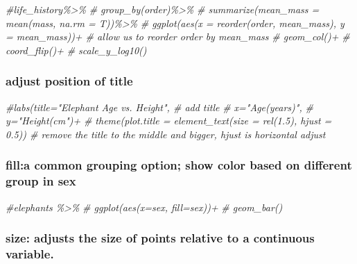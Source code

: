\documentclass[
]{article}
\newenvironment{Shaded}{\begin{snugshade}}{\end{snugshade}}
\newcommand{\CommentTok}[1]{\textcolor[rgb]{0.56,0.35,0.01}{\textit{#1}}}
\begin{document}
\begin{Shaded}
\begin{Highlighting}[]
\CommentTok{\#life\_history\%\textgreater{}\%}
\CommentTok{\#  group\_by(order)\%\textgreater{}\%}
\CommentTok{\#  summarize(mean\_mass = mean(mass, na.rm = T))\%\textgreater{}\%}
\CommentTok{\#  ggplot(aes(x = reorder(order, mean\_mass), y = mean\_mass))+ \# allow us to reorder order by mean\_mass}
\CommentTok{\#  geom\_col()+}
\CommentTok{\#  coord\_flip()+}
\CommentTok{\#  scale\_y\_log10()}
\end{Highlighting}
\end{Shaded}

\hypertarget{adjust-position-of-title}{%
\subsubsection{adjust position of
title}\label{adjust-position-of-title}}

\begin{Shaded}
\begin{Highlighting}[]
\CommentTok{\#labs(title="Elephant Age vs. Height", \# add title}
\CommentTok{\#       x="Age(years)", }
\CommentTok{\#       y="Height(cm")+}
\CommentTok{\#  theme(plot.title = element\_text(size = rel(1.5), hjust = 0.5)) \# remove the title to the middle and bigger, hjust is horizontal adjust}
\end{Highlighting}
\end{Shaded}

\hypertarget{filla-common-grouping-option-show-color-based-on-different-group-in-sex}{%
\subsubsection{fill:a common grouping option; show color based on
different group in
sex}\label{filla-common-grouping-option-show-color-based-on-different-group-in-sex}}

\begin{Shaded}
\begin{Highlighting}[]
\CommentTok{\#elephants \%\textgreater{}\% }
\CommentTok{\#  ggplot(aes(x=sex, fill=sex))+}
\CommentTok{\#  geom\_bar()}
\end{Highlighting}
\end{Shaded}

\hypertarget{size-adjusts-the-size-of-points-relative-to-a-continuous-variable.}{%
\subsubsection{size: adjusts the size of points relative to a continuous
variable.}\label{size-adjusts-the-size-of-points-relative-to-a-continuous-variable.}}
\end{document}
